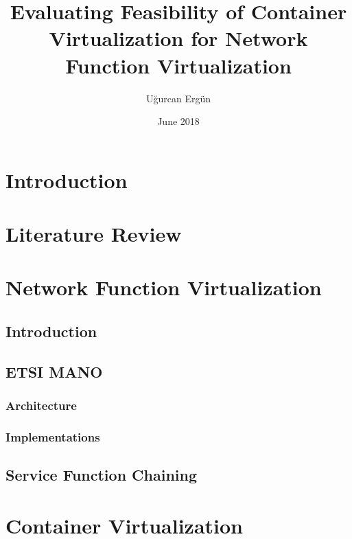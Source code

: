 \documentclass[12pt,oneandhalf,chaparabic,ceng,ms,eng,oneside,pntc]{gsufbe}
\author{Uğurcan Ergün}
\title{Evaluating Feasibility of Container Virtualization for Network Function Virtualization}
\date{June 2018}
\begin{document}
\addtolength{\textheight}{1.5cm}
\newlength\myindent
\setlength\myindent{6em}
\newcommand\bindent{%
  \begingroup
  \setlength{\itemindent}{\myindent}
  \addtolength{\algorithmicindent}{\myindent}
}
\newcommand\eindent{\endgroup}
\begin{preliminaries}
%
\end{preliminaries}
%
%
%
\newtheorem{thm}{Definition}[chapter]
\renewcommand{\thethm}{\arabic{chapter}.\arabic{thm}}
\newtheorem{prp}{Proposition}[chapter]
\renewcommand{\theprp}{\arabic{chapter}.\arabic{prp}}
\newenvironment{prf}{\noindent{\bf Proof}}{$\hfill \Box$ \vspace{10pt}}

\chapter{Introduction}

\chapter{Literature Review}

\chapter{Network Function Virtualization}
\section{Introduction} 
\section{ETSI MANO}
\subsection{Architecture}
\subsection{Implementations}
\section{Service Function Chaining}

\chapter{Container Virtualization}
\end{document}
